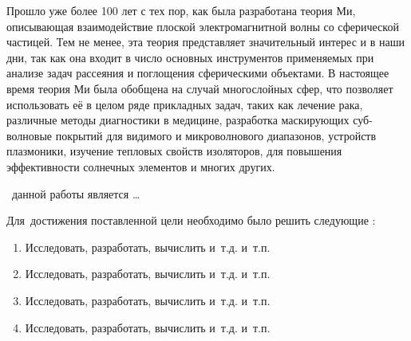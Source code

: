 {\actuality} Прошло уже более 100 лет с тех пор, как была разработана
теория Ми, описывающая взаимодействие плоской электромагнитной волны
со сферической частицей.  Тем не менее, эта теория представляет
значительный интерес и в наши дни, так как она входит в число основных
инструментов применяемых при анализе задач рассеяния и поглощения
сферическими объектами.  В настоящее время теория Ми была обобщена на
случай многослойных сфер, что позволяет использовать её в целом ряде
прикладных задач, таких как лечение рака, различные методы диагностики
в медицине, разработка маскирующих суб-волновые покрытий для видимого
и микроволнового диапазонов, устройств плазмоники, изучение тепловых
свойств изоляторов, для повышения эффективности солнечных элементов и
многих других.


 \aim\ данной работы является \ldots

Для~достижения поставленной цели необходимо было решить следующие {\tasks}:
\begin{enumerate}
  \item Исследовать, разработать, вычислить и~т.\:д. и~т.\:п.
  \item Исследовать, разработать, вычислить и~т.\:д. и~т.\:п.
  \item Исследовать, разработать, вычислить и~т.\:д. и~т.\:п.
  \item Исследовать, разработать, вычислить и~т.\:д. и~т.\:п.
\end{enumerate}

